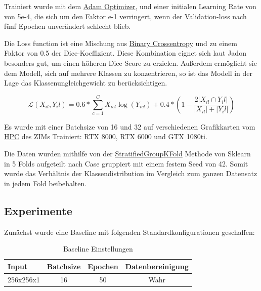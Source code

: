  Trainiert wurde mit dem
\href{https://optimization.cbe.cornell.edu/index.php?title=Adam}{Adam Optimizer},
 und einer initialen Learning Rate von von 5e-4, die sich um den Faktor e-1 verringert, wenn der Validation-loss nach fünf Epochen unverändert schlecht blieb. 
 
 Die Loss function ist eine Mischung aus 
\href{https://www.analyticsvidhya.com/blog/2021/03/binary-cross-entropy-log-loss-for-binary-classification/}{Binary Crossentropy} und zu einem Faktor von 0.5 der Dice-Koeffizient. Diese Kombination eignet sich laut Jadon  \citet{Jadon_2020} besonders gut, um einen höheren Dice Score zu erzielen. Außerdem ermöglicht sie dem Modell, sich auf mehrere Klassen zu konzentrieren, so ist das Modell in der Lage das Klassenungleichgewicht zu berücksichtigen. 

\begin{equation}
\mathcal{L}\left(X_{i l},{Y_{i}} l\right)= 0.6 * \sum_{c=1}^{C} X_{i c l} \log \left({Y}_{i c l}\right)+0.4 *\left(1-\frac{2\left|X_{i l} \cap {Y_{i}} l\right|}{\left|X_{i l}\right|+\left|{Y_{i}} l\right|}\right)
\end{equation}

Es wurde mit einer Batchsize von 16 und 32 auf verschiedenen Grafikkarten vom 
\href{https://wiki.hhu.de/display/HPC/Abschlussarbeiten+im+HPC}{HPC} des ZIMs Trainiert: RTX 8000, RTX 6000 und GTX 1080ti.

Die Daten wurden mithilfe von der 
\href{https://scikit-learn.org/stable/modules/generated/sklearn.model_selection.StratifiedGroupKFold.html}{StratifiedGroupKFold} Methode von Sklearn in 5 Folds aufgeteilt nach Case gruppiert mit einem festem Seed von 42. Somit wurde das Verhältnis der Klassendistribution im Vergleich zum ganzen Datensatz in jedem Fold beibehalten. 

\subsection{Experimente}
Zunächst wurde eine Baseline mit folgenden Standardkonfigurationen geschaffen:

\begin{table}[H]
\centering
\begin{tabular}{l|c|c|c}
Input & Batchsize & Epochen & Datenbereinigung \\\hline
256x256x1 & 16 & 50 & Wahr \\
\end{tabular}
\caption{\label{tab:widgets}Baseline Einstellungen}
\end{table}

